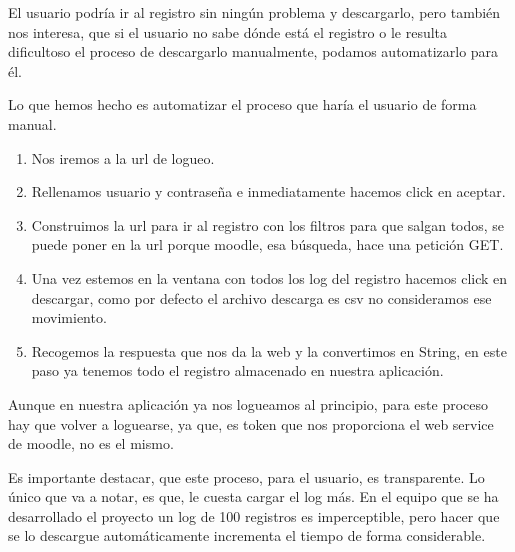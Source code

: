 El usuario podría ir al registro sin ningún problema y descargarlo, pero también nos interesa, que si el usuario no sabe dónde está el registro o le resulta dificultoso el proceso de descargarlo manualmente, podamos automatizarlo para él.
 
Lo que hemos hecho es automatizar el proceso que haría el usuario de forma manual. 
 \begin{enumerate}
 	\item 
 	Nos iremos a la url de logueo.
 	\item 
 	Rellenamos usuario y contraseña e inmediatamente hacemos click en aceptar.
 	\item 
 	Construimos la url para ir al registro con los filtros para que salgan todos, se puede poner en la url porque moodle, esa búsqueda, hace una petición GET.
 	\item 
 	Una vez estemos en la ventana con todos los log del registro hacemos click en descargar, como por defecto el archivo descarga es csv no consideramos ese movimiento.
 	\item 
 	Recogemos la respuesta que nos da la web y la convertimos en String, en este paso ya tenemos todo el registro almacenado en nuestra aplicación.
 \end{enumerate}
 
Aunque en nuestra aplicación ya nos logueamos al principio, para este proceso hay que volver a loguearse, ya que, es token que nos proporciona el web service de moodle, no es el mismo.

Es importante destacar, que este proceso, para el usuario, es transparente. Lo único que va a notar, es que, le cuesta cargar el log más. En el equipo que se ha desarrollado el proyecto un log de 100 registros es imperceptible, pero hacer que se lo descargue automáticamente incrementa el tiempo de forma considerable.
 